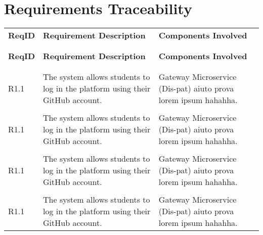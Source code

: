 \chapter{Requirements Traceability}

\begin{longtable}{p{}p{}p{}}
    \textbf{ReqID} & \textbf{Requirement Description} & \textbf{Components Involved} \\
    \vspace{0.5em}\\
    \hline
    \vspace{0.5em}\\
    \endfirsthead
    \textbf{ReqID} & \textbf{Requirement Description} & \textbf{Components Involved} \\
    \vspace{0.5em}\\
    \hline
    \vspace{0.5em}\\
    \endhead

    R1.1 &
    The system allows students to log in the platform using their GitHub account. &
    Gateway Microservice (Dis-pat) aiuto prova lorem ipsum hahahha. \\
    \vspace{0.5em}\\
    R1.1 &
    The system allows students to log in the platform using their GitHub account. &
    Gateway Microservice (Dis-pat) aiuto prova lorem ipsum hahahha. \\
    \vspace{0.5em}\\
    R1.1 &
    The system allows students to log in the platform using their GitHub account. &
    Gateway Microservice (Dis-pat) aiuto prova lorem ipsum hahahha. \\
    \vspace{0.5em}\\
    R1.1 &
    The system allows students to log in the platform using their GitHub account. &
    Gateway Microservice (Dis-pat) aiuto prova lorem ipsum hahahha. \\

\end{longtable}